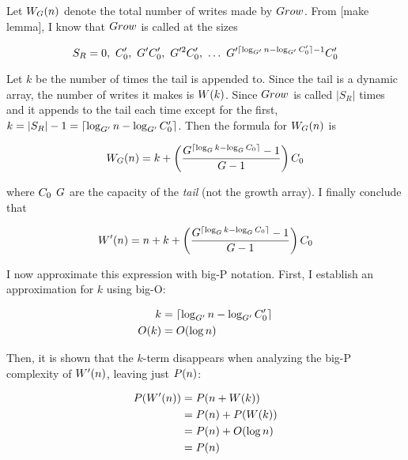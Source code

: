 Let $W_G(n)$ denote the total number of writes made by $Grow$. From [make lemma], I know that $Grow$ is called at the sizes

$$
S_R = 0,\ \InitCapacitynew,\ \GrowthFactornew\InitCapacitynew,\ \GrowthFactornew^2\InitCapacitynew,\ \ldots\ \GrowthFactornew^{\lceil \log_{\GrowthFactornew} \varnitems - \log_{\GrowthFactornew} \InitCapacitynew \rceil - 1}\InitCapacitynew
$$

Let $k$ be the number of times the tail is appended to. Since the tail is a dynamic array, the number of writes it makes is $W(k)$. Since $Grow$ is called $|S_R|$ times and it appends to the tail each time except for the first, $k = |S_R| - 1 = \lceil \log_{G'} n - \log_{G'} C_0' \rceil$. Then the formula for $W_G(n)$ is

$$
W_G(n) = k + \left( \frac{G^{\lceil \log_{G} k - \log_{G} C_0 \rceil} - 1}{G - 1} \right) C_0
$$

where $C_0$ $G$ are the capacity of the \textit{tail} (not the growth array). I finally conclude that

$$
W'(n) = n + k + \left( \frac{G^{\lceil \log_{G} k - \log_{G} C_0 \rceil} - 1}{G - 1} \right) C_0
$$

I now approximate this expression with big-P notation. First, I establish an approximation for $k$ using big-O:

\begin{align*}
k &= \lceil \log_{G'} n - \log_{G'} C_0' \rceil\\
O(k) &= O(\log n)
\end{align*}

Then, it is shown that the $k$-term disappears when analyzing the big-P complexity of $W'(n)$, leaving just $P(n)$:

\begin{align*}
P(W'(n)) &= P(n + W(k))\\
&= P(n) + P(W(k))\\
&= P(n) + O(\log n)\\
&= P(n)
\end{align*}

